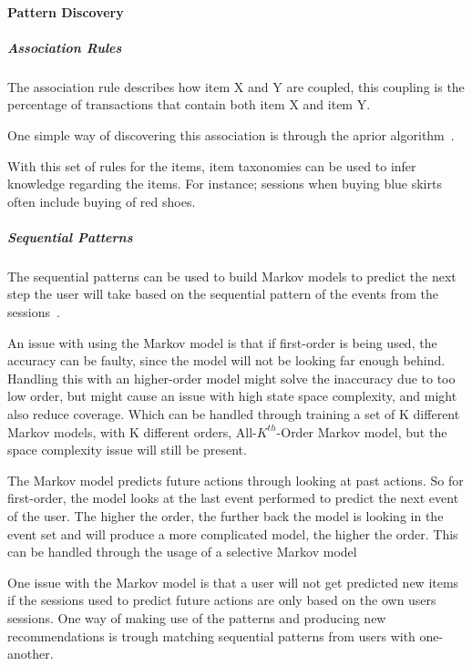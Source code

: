     \paragraph{Pattern Discovery} %
        \label{par:pattern_discovery}
        \subparagraph{Association Rules} %
            \label{subp:association_rules}
            The association rule describes how item X and Y are coupled, this coupling is the percentage of transactions that contain both item X and item Y.

            One simple way of discovering this association is through the aprior algorithm~\cite{Agrawal:1994:FAM:645920.672836}.

            With this set of rules for the items, item taxonomies can be used to infer knowledge regarding the items.
            For instance; sessions when buying blue skirts often include buying of red shoes.
        \subparagraph{Sequential Patterns} %
        \label{subp:sequential_patterns}
            The sequential patterns can be used to build Markov models to predict the next step the user will take based on the sequential pattern of the events from the sessions~\cite{Deshpande:2004:SMM:990301.990304}.

            An issue with using the Markov model is that if first-order is being used, the accuracy can be faulty, since the model will not be looking far enough behind.
            Handling this with an higher-order model might solve the inaccuracy due to too low order, but might cause an issue with high state space complexity, and might also reduce coverage.
            Which can be handled through training a set of K different Markov models, with K different orders, All-$K^{th}$-Order Markov model, but the space complexity issue will still be present.

            The Markov model predicts future actions through looking at past actions.
            So for first-order, the model looks at the last event performed to predict the next event of the user.
            The higher the order, the further back the model is looking in the event set and will produce a more complicated model, the higher the order.
            This can be handled through the usage of a selective Markov model~\cite{Deshpande:2004:SMM:990301.990304}

            One issue with the Markov model is that a user will not get predicted new items if the sessions used to predict future actions are only based on the own users sessions.
            One way of making use of the patterns and producing new recommendations is trough matching sequential patterns from users with one-another. 

